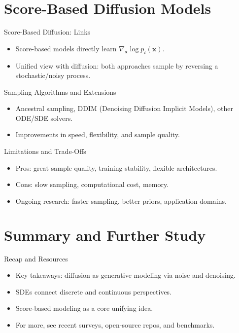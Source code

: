 \documentclass{beamer}
\newcommand{\bs}[1]{\boldsymbol{#1}}
\begin{document}
\section{Score-Based Diffusion Models}
\begin{frame}{Score-Based Diffusion: Links}
    \begin{itemize}
        \item Score-based models directly learn \(\nabla_{\bs{x}} \log p_t(\bs{x})\).
        \item Unified view with diffusion: both approaches sample by reversing a stochastic/noisy process.
    \end{itemize}
\end{frame}

\begin{frame}{Sampling Algorithms and Extensions}
    \begin{itemize}
        \item Ancestral sampling, DDIM (Denoising Diffusion Implicit Models), other ODE/SDE solvers.
        \item Improvements in speed, flexibility, and sample quality.
    \end{itemize}
\end{frame}

\begin{frame}{Limitations and Trade-Offs}
    \begin{itemize}
        \item Pros: great sample quality, training stability, flexible architectures.
        \item Cons: slow sampling, computational cost, memory.
        \item Ongoing research: faster sampling, better priors, application domains.
    \end{itemize}
\end{frame}

\section{Summary and Further Study}
\begin{frame}{Recap and Resources}
    \begin{itemize}
        \item Key takeaways: diffusion as generative modeling via noise and denoising.
        \item SDEs connect discrete and continuous perspectives.
        \item Score-based modeling as a core unifying idea.
        \item For more, see recent surveys, open-source repos, and benchmarks.
    \end{itemize}
\end{frame}
\end{document}
